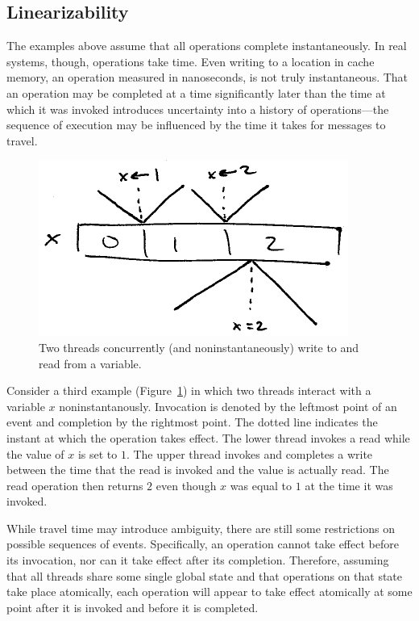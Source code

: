 \documentclass{sig-alternate}
\begin{document}
\subsection{Linearizability}

The examples above assume that all operations complete instantaneously. In real systems, though, operations take time. Even writing to a location in cache memory, an operation measured in nanoseconds, is not truly instantaneous. That an operation may be completed at a time significantly later than the time at which it was invoked introduces uncertainty into a history of operations---the sequence of execution may be influenced by the time it takes for messages to travel.

\begin{figure}[h]
  \centering
  \includegraphics{noninstantaneity}
  \caption{Two threads concurrently (and noninstantaneously) write to and read from a variable.}
\label{figure:time}
\end{figure}

Consider a third example (Figure~\ref{figure:time}) in which two threads interact with a variable $x$ noninstantanously. Invocation is denoted by the leftmost point of an event and completion by the rightmost point. The dotted line indicates the instant at which the operation takes effect. The lower thread invokes a read while the value of $x$ is set to $1$. The upper thread invokes and completes a write between the time that the read is invoked and the value is actually read. The read operation then returns $2$ even though $x$ was equal to $1$ at the time it was invoked.

While travel time may introduce ambiguity, there are still some restrictions on possible sequences of events. Specifically, an operation cannot take effect before its invocation, nor can it take effect after its completion. Therefore, assuming that all threads share some single global state and that operations on that state take place atomically, each operation will appear to take effect atomically at some point after it is invoked and before it is completed.
\end{document}
